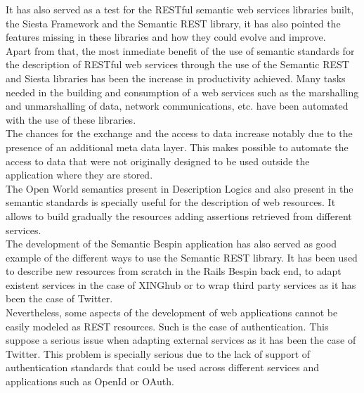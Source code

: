 It has also served as a test for the RESTful semantic web services libraries built, the Siesta Framework and the
Semantic REST library, it has also pointed the features missing in these libraries and how they could evolve and
improve.\\

Apart from that, the most inmediate benefit of the use of semantic standards for the description of RESTful web services
through the use of the Semantic REST and Siesta libraries has been the increase in productivity achieved. Many tasks
needed in the building and consumption of a web services such as the marshalling and unmarshalling of data, network
communications, etc. have been automated with the use of these libraries.\\

The chances for the exchange and the access to data increase notably due to the presence of an additional meta data
layer. This makes possible to automate the access to data that were not originally designed to be used outside the
application where they are stored.\\

The Open World semantics present in Description Logics and also present in the semantic standards is specially useful for
the description of web resources. It allows to build gradually the resources adding assertions retrieved from different
services. \\

The development of the Semantic Bespin application has also served as good example of the different ways to use the
Semantic REST library. It has been used to describe new resources from scratch in the Rails Bespin back end, to adapt
existent services in the case of XINGhub or to wrap third party services as it has been the case of Twitter.\\

Nevertheless, some aspects of the development of web applications cannot be easily modeled as REST resources. Such is
the case of authentication. This suppose a serious issue when adapting external services as it has been the case of
Twitter. This problem is specially serious due to the lack of support of authentication standards that could be used across different
services and applications such as OpenId or OAuth.\\

